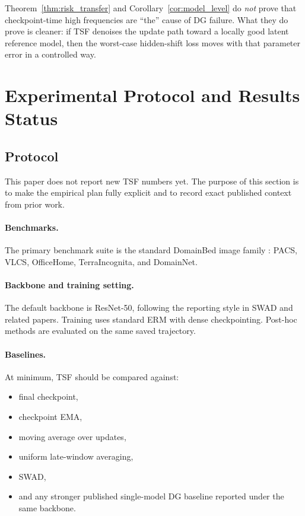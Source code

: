\documentclass{article}
\newcommand{\tsf}{\textup{\textsc{TSF}}}
\newcommand{\swad}{\textup{\textsc{SWAD}}}
\newcommand{\erm}{\textup{\textsc{ERM}}}
\begin{document}
Theorem~\ref{thm:risk_transfer} and Corollary~\ref{cor:model_level} do \emph{not} prove that checkpoint-time high frequencies are ``the'' cause of DG failure. What they do prove is cleaner: if \tsf{} denoises the update path toward a locally good latent reference model, then the worst-case hidden-shift loss moves with that parameter error in a controlled way.

\section{Experimental Protocol and Results Status}
\label{sec:experiments}

\subsection{Protocol}

This paper does not report new \tsf{} numbers yet. The purpose of this section is to make the empirical plan fully explicit and to record exact published context from prior work.

\paragraph{Benchmarks.}
The primary benchmark suite is the standard DomainBed image family \citep{gulrajani2021domainbed}: PACS, VLCS, OfficeHome, TerraIncognita, and DomainNet.

\paragraph{Backbone and training setting.}
The default backbone is ResNet-50, following the reporting style in \swad{} and related papers. Training uses standard \erm{} with dense checkpointing. Post-hoc methods are evaluated on the same saved trajectory.

\paragraph{Baselines.}
At minimum, \tsf{} should be compared against:
\begin{itemize}[leftmargin=1.4em]
    \item final checkpoint,
    \item checkpoint EMA,
    \item moving average over updates,
    \item uniform late-window averaging,
    \item \swad{},
    \item and any stronger published single-model DG baseline reported under the same backbone.
\end{itemize}
\end{document}
